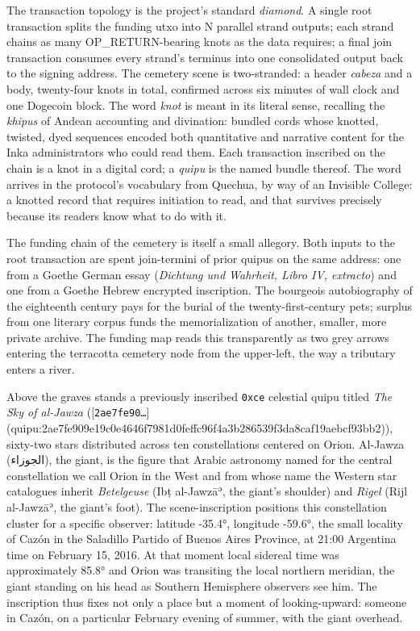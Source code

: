 \documentclass[11pt,openany]{book}
\begin{document}
The transaction topology is the project's standard \emph{diamond}. A single root transaction splits the funding utxo into N parallel strand outputs; each strand chains as many OP\_RETURN-bearing knots as the data requires; a final join transaction consumes every strand's terminus into one consolidated output back to the signing address. The cemetery scene is two-stranded: a header \emph{cabeza} and a body, twenty-four knots in total, confirmed across six minutes of wall clock and one Dogecoin block. The word \emph{knot} is meant in its literal sense, recalling the \emph{khipus} of Andean accounting and divination: bundled cords whose knotted, twisted, dyed sequences encoded both quantitative and narrative content for the Inka administrators who could read them. Each transaction inscribed on the chain is a knot in a digital cord; a \emph{quipu} is the named bundle thereof. The word arrives in the protocol's vocabulary from Quechua, by way of an Invisible College: a knotted record that requires initiation to read, and that survives precisely because its readers know what to do with it.

The funding chain of the cemetery is itself a small allegory. Both inputs to the root transaction are spent join-termini of prior quipus on the same address: one from a Goethe German essay (\emph{Dichtung und Wahrheit, Libro IV, extracto}) and one from a Goethe Hebrew encrypted inscription. The bourgeois autobiography of the eighteenth century pays for the burial of the twenty-first-century pets; surplus from one literary corpus funds the memorialization of another, smaller, more private archive. The funding map reads this transparently as two grey arrows entering the terracotta cemetery node from the upper-left, the way a tributary enters a river.

Above the graves stands a previously inscribed \texttt{0xce} celestial quipu titled \emph{The Sky of al-Jawza} ([\texttt{2ae7fe90…}](quipu:2ae7fe909e19c0e4646f7981d0feffc96f4a3b286539f3da8caf19aebcf93bb2)), sixty-two stars distributed across ten constellations centered on Orion. Al-Jawza (الجوزاء), the giant, is the figure that Arabic astronomy named for the central constellation we call Orion in the West and from whose name the Western star catalogues inherit \emph{Betelgeuse} (Ibṭ al-Jawzāʾ, the giant's shoulder) and \emph{Rigel} (Rijl al-Jawzāʾ, the giant's foot). The scene-inscription positions this constellation cluster for a specific observer: latitude -35.4°, longitude -59.6°, the small locality of Cazón in the Saladillo Partido of Buenos Aires Province, at 21:00 Argentina time on February 15, 2016. At that moment local sidereal time was approximately 85.8° and Orion was transiting the local northern meridian, the giant standing on his head as Southern Hemisphere observers see him. The inscription thus fixes not only a place but a moment of looking-upward: someone in Cazón, on a particular February evening of summer, with the giant overhead.
\end{document}
